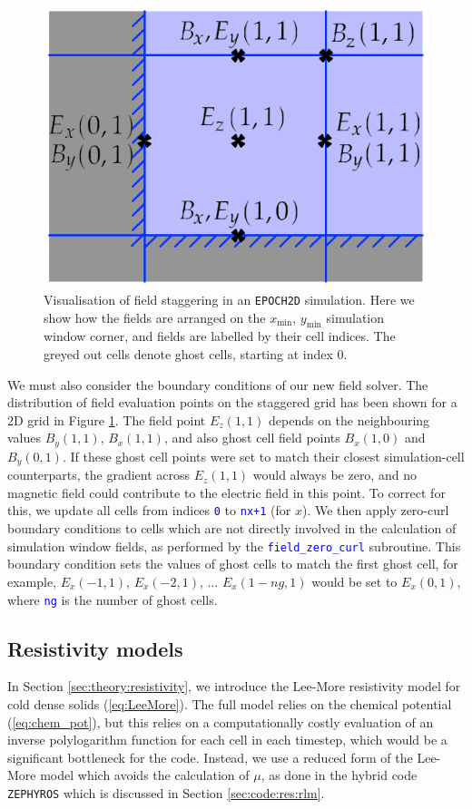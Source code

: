 \documentclass[12pt]{article}
\numberwithin{equation}{section}
\begin{document}
\begin{figure}
\centering
\includegraphics[width=0.6\linewidth]{Figures/Cell_stagger.png}
\caption{Visualisation of field staggering in an \texttt{EPOCH2D} simulation. Here we show how the fields are arranged on the $x_\text{min}$, $y_\text{min}$ simulation window corner, and fields are labelled by their cell indices. The greyed out cells denote ghost cells, starting at index 0.}
\label{fig:cell_stagger}
\end{figure}

We must also consider the boundary conditions of our new field solver. The distribution of field evaluation points on the staggered grid has been shown for a 2D grid in Figure \ref{fig:cell_stagger}. The field point $E_z(1,1)$ depends on the neighbouring values $B_y(1,1)$, $B_x(1,1)$, and also ghost cell field points $B_x(1,0)$ and $B_y(0,1)$. If these ghost cell points were set to match their closest simulation-cell counterparts, the gradient across $E_z(1,1)$ would always be zero, and no magnetic field could contribute to the electric field in this point. To correct for this, we update all cells from indices \textcolor{blue}{\texttt{0}} to \textcolor{blue}{\texttt{nx+1}} (for $x$). We then apply zero-curl boundary conditions to cells which are not directly involved in the calculation of simulation window fields, as performed by the \textcolor{blue}{\texttt{field\_zero\_curl}} subroutine. This boundary condition sets the values of ghost cells to match the first ghost cell, for example, $E_x(-1,1)$, $E_x(-2,1)$, ... $E_x(1-ng,1)$ would be set to $E_x(0,1)$, where \textcolor{blue}{\texttt{ng}} is the number of ghost cells.

\subsection{Resistivity models} \label{sec:code:res}

In Section \ref{sec:theory:resistivity}, we introduce the Lee-More resistivity model for cold dense solids (\ref{eq:LeeMore}). The full model relies on the chemical potential (\ref{eq:chem_pot}), but this relies on a computationally costly evaluation of an inverse polylogarithm function for each cell in each timestep, which would be a significant bottleneck for the code. Instead, we use a reduced form of the Lee-More model which avoids the calculation of $\mu$, as done in the hybrid code \texttt{ZEPHYROS} which is discussed in Section \ref{sec:code:res:rlm}.
\end{document}
